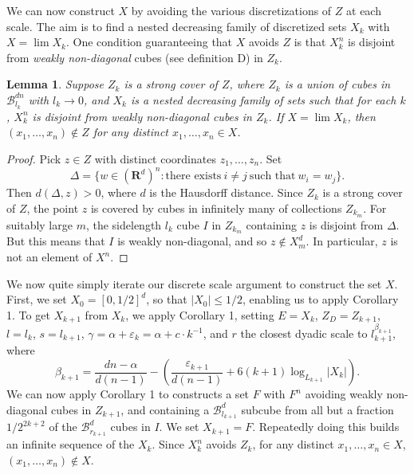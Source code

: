 \documentclass[dvipsnames]{article}
\theoremstyle{plain}
\newtheorem{lemma}{Lemma}
\theoremstyle{plain}
\begin{document}
We can now construct $X$ by avoiding the various discretizations of $Z$ at each scale. The aim is to find a nested decreasing family of discretized sets $X_k$ with $X = \lim X_k$. One condition guaranteeing that $X$ avoids $Z$ is that $X_k^n$ is disjoint from {\it weakly non-diagonal} cubes (see definition D) in $Z_k$.

\begin{lemma}
	Suppose $Z_k$ is a strong cover of $Z$, where $Z_k$ is a union of cubes in $\mathcal{B}^{dn}_{l_k}$ with $l_k \to 0$, and $X_k$ is a nested decreasing family of sets such that for each $k$, $X_k^n$ is disjoint from weakly non-diagonal cubes in $Z_k$. If $X = \lim X_k$, then $(x_1, \dots, x_n) \not \in Z$ for any distinct $x_1, \dots, x_n \in X$.
\end{lemma}
\begin{proof}
	Pick $z \in Z$ with distinct coordinates $z_1, \dots, z_n$. Set
	\[ \Delta = \{ w \in (\mathbf{R}^d)^n : \text{there exists}\ i \neq j\ \text{such that}\ w_i = w_j \}. \]
	Then $d(\Delta,z) > 0$, where $d$ is the Hausdorff distance. Since $Z_k$ is a strong cover of $Z$, the point $z$ is covered by cubes in infinitely many of collections $Z_{k_m}$. For suitably large $m$, the sidelength $l_k$ cube $I$ in $Z_{k_m}$ containing $z$ is disjoint from $\Delta$. But this means that $I$ is weakly non-diagonal, and so $z \not \in X_m^d$. In particular, $z$ is not an element of $X^n$.
\end{proof}

We now quite simply iterate our discrete scale argument to construct the set $X$. First, we set $X_0 = [0,1/2]^d$, so that $|X_0| \leq 1/2$, enabling us to apply Corollary 1. To get $X_{k+1}$ from $X_k$, we apply Corollary 1, setting $E = X_k$, $Z_D = Z_{k+1}$, $l = l_k$, $s = l_{k+1}$, $\gamma = \alpha + \varepsilon_k = \alpha + c \cdot k^{-1}$, and $r$ the closest dyadic scale to $l_{k+1}^{\beta_{k+1}}$, where
%
\[ \beta_{k+1} = \frac{dn - \alpha}{d(n-1)} - \left( \frac{\varepsilon_{k+1}}{d(n-1)} + 6(k+1) \log_{L_{k+1}} |X_k| \right). \]
%
We can now apply Corollary 1 to constructs a set $F$ with $F^n$ avoiding weakly non-diagonal cubes in $Z_{k+1}$, and containing a $\mathcal{B}^d_{l_{k+1}}$ subcube from all but a fraction $1/2^{2k +2}$ of the $\mathcal{B}^d_{r_{k+1}}$ cubes in $I$. We set $X_{k+1} = F$. Repeatedly doing this builds an infinite sequence of the $X_k$. Since $X_k^n$ avoids $Z_k$, for any distinct $x_1, \dots, x_n \in X$, $(x_1, \dots, x_n) \not \in X$.
\end{document}

